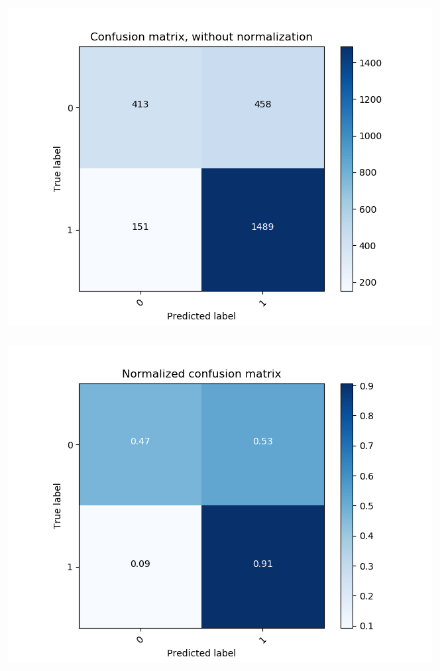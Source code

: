 \begin{figure}[H]
\begin{minipage}[b]{0.45\columnwidth}
		\centering
		\includegraphics[clip, width=\linewidth]{fig/chapter4/3d/confusion_matrix/count_confusion_matrix_False_50_gru}
		\label{fig: count_he_preprocess}
	\end{minipage}
	\begin{minipage}[b]{0.45\columnwidth}
		\centering
		\includegraphics[clip, width=\linewidth]{fig/chapter4/3d/confusion_matrix/normalized_confusion_matrix_False_50_gru}
		\label{fig: he_preprocess}
	\end{minipage}
	\begin{minipage}[b]{0.45\columnwidth}
		\centering

\end{minipage}
\end{figure}
